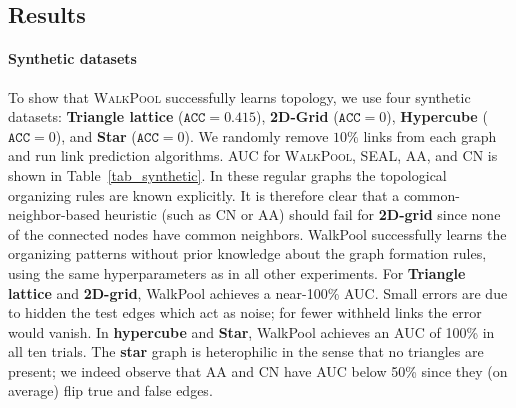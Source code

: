 \documentclass[11pt]{article}
\newcommand{\walkpool}{\textsc{WalkPool}\xspace}
\newcommand{\UPDATE}[1]{\textcolor{WowColor}{{#1}}}
\renewcommand{\UPDATE}[1]{#1}
\begin{document}
\subsection{Results}
\vspace{-1mm}
\UPDATE{\paragraph{Synthetic datasets} To show that \walkpool successfully learns topology, we use four synthetic datasets: \textbf{Triangle lattice} ($\mathtt{ACC}=0.415$), \textbf{2D-Grid} ($\mathtt{ACC}=0$), \textbf{Hypercube} ($\mathtt{ACC}=0$), and \textbf{Star} ($\mathtt{ACC}=0$). We randomly remove $10\%$ links from each graph and run link prediction algorithms. AUC for \walkpool, SEAL, AA, and CN is shown in Table~\ref{tab_synthetic}. In these regular graphs the topological organizing rules are known explicitly. It is therefore clear that a common-neighbor-based heuristic (such as CN or AA) should fail for \textbf{2D-grid} since none of the connected nodes have common neighbors. WalkPool successfully learns the organizing patterns without  prior knowledge about the graph formation rules, using the same hyperparameters as in all other experiments. For \textbf{Triangle lattice} and \textbf{2D-grid}, WalkPool achieves a near-100\% AUC. Small errors are due to hidden the test edges which act as noise; for fewer withheld links the error would vanish. In \textbf{hypercube} and \textbf{Star}, WalkPool achieves an AUC of 100\% in all ten trials. The \textbf{star} graph is heterophilic in the sense that no triangles are present; we indeed observe that AA and CN have AUC below 50\% since they (on average) flip true and false edges.} 
\begin{table}[!]
\centering
{}
    \caption{AUC for synthetic graphs over 10 independent trials.}
\label{tab_synthetic}
\vspace{-3mm}
\end{table}
\vspace{-4mm}
\end{document}

